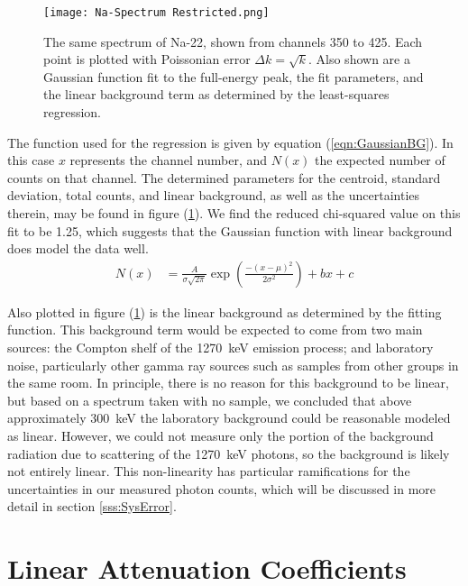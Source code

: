 \documentclass[letter]{article}
\begin{document}
\begin{figure}[h] \centering
    \texttt{[image: Na-Spectrum Restricted.png]}
    \caption{The same spectrum of Na-22, shown from channels 350 to 425. Each point is plotted with Poissonian error $\Delta k = \sqrt{k}$. Also shown are a Gaussian function fit to the full-energy peak, the fit parameters, and the linear background term as determined by the least-squares regression.}
    \label{fig:NaSpecRestr}
\end{figure}

The function used for the regression is given by equation (\ref{eqn:GaussianBG}). In this case $x$ represents the channel number, and $N(x)$ the expected number of counts on that channel. The determined parameters for the centroid, standard deviation, total counts, and linear background, as well as the uncertainties therein, may be found in figure (\ref{fig:NaSpecRestr}). We find the reduced chi-squared value on this fit to be 1.25, which suggests that the Gaussian function with linear background does model the data well.
\begin{align} \label{eqn:GaussianBG}
N(x)
&=
\frac{A}{\sigma \sqrt{2 \pi}} \exp \left( \frac{- (x-\mu)^2}{2 \sigma^2} \right) + bx + c
\end{align}

Also plotted in figure (\ref{fig:NaSpecRestr}) is the linear background as determined by the fitting function. This background term would be expected to come from two main sources: the Compton shelf of the \qty{1270}{\kilo\electronvolt} emission process; and laboratory noise, particularly other gamma ray sources such as samples from other groups in the same room. In principle, there is no reason for this background to be linear, but based on a spectrum taken with no sample, we concluded that above approximately \qty{300}{\kilo\electronvolt} the laboratory background could be reasonable modeled as linear. However, we could not measure only the portion of the background radiation due to scattering of the \qty{1270}{\kilo\electronvolt} photons, so the background is likely not entirely linear. This non-linearity has particular ramifications for the uncertainties in our measured photon counts, which will be discussed in more detail in section \ref{sss:SysError}.


\section{Linear Attenuation Coefficients}
\end{document}
